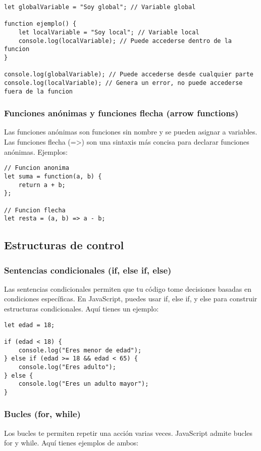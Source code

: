 \documentclass[executivepaper]{article}
\begin{document}
\begin{lstlisting}
let globalVariable = "Soy global"; // Variable global

function ejemplo() {
    let localVariable = "Soy local"; // Variable local
    console.log(localVariable); // Puede accederse dentro de la funcion
}

console.log(globalVariable); // Puede accederse desde cualquier parte
console.log(localVariable); // Genera un error, no puede accederse fuera de la funcion
\end{lstlisting}

\subsubsection*{Funciones anónimas y funciones flecha (arrow functions)}
Las funciones anónimas son funciones sin nombre y se pueden asignar a variables. Las funciones flecha (=>) son una sintaxis más concisa para declarar funciones anónimas. Ejemplos:

\begin{lstlisting}
// Funcion anonima
let suma = function(a, b) {
    return a + b;
};

// Funcion flecha
let resta = (a, b) => a - b;
\end{lstlisting}

\subsection{Estructuras de control}
\subsubsection*{Sentencias condicionales (if, else if, else)}
Las sentencias condicionales permiten que tu código tome decisiones basadas en condiciones específicas. En JavaScript, puedes usar if, else if, y else para construir estructuras condicionales. Aquí tienes un ejemplo:

\begin{lstlisting}
let edad = 18;

if (edad < 18) {
    console.log("Eres menor de edad");
} else if (edad >= 18 && edad < 65) {
    console.log("Eres adulto");
} else {
    console.log("Eres un adulto mayor");
}  
\end{lstlisting}

\subsubsection*{Bucles (for, while)}
Los bucles te permiten repetir una acción varias veces. JavaScript admite bucles for y while. Aquí tienes ejemplos de ambos:
\end{document}
